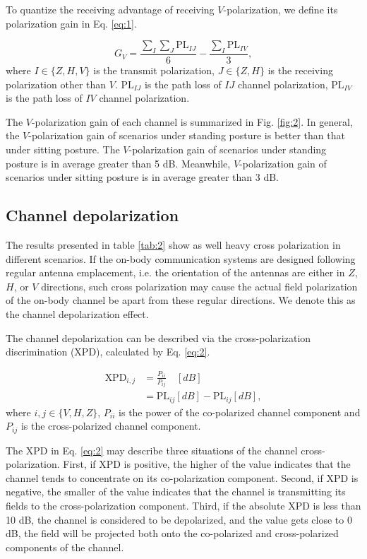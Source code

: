 \documentclass[conference]{IEEEtran}
\begin{document}
To quantize the receiving advantage of receiving $V$-polarization, we define its polarization gain in Eq. \ref{eq:1}.

\begin{equation}
	G_{V}=\frac{\sum\limits_I\sum\limits_J\text{PL}_{IJ}}{6} -\frac{\sum\limits_I{\text{PL}_{IV}}}{3},
\label{eq:1}
\end{equation}
where $I\in\{Z,H,V\}$ is the transmit polarization, $J\in\{Z,H\}$ is the receiving polarization other than $V$. $\text{PL}_{IJ}$ is the path loss of $IJ$ channel polarization, $\text{PL}_{IV}$ is the path loss of $IV$ channel polarization.

The $V$-polarization gain of each channel is summarized in Fig. \ref{fig:2}. In general, the $V$-polarization gain of scenarios under standing posture is better than that under sitting posture. The $V$-polarization gain of scenarios under standing posture is in average greater than 5 dB. Meanwhile, $V$-polarization gain of scenarios under sitting posture is in average greater than 3 dB.

\subsection{Channel depolarization}
The results presented in table \ref{tab:2} show as well heavy cross polarization in different scenarios. If the on-body communication systems are designed following regular antenna emplacement, i.e. the orientation of the antennas are either in $Z$, $H$, or $V$ directions, such cross polarization may cause the actual field polarization of the on-body channel be apart from these regular directions. We denote this as the channel depolarization effect.

The channel depolarization can be described via the cross-polarization discrimination (XPD), calculated by Eq. \ref{eq:2}.

 \begin{align}
	 \text{XPD}_{i,j}&=\frac{P_{ii}}{P_{ij}} \quad[dB]\nonumber\\
	 &=\text{PL}_{ij}[dB]-\text{PL}_{ij}[dB], \label{eq:2}
\end{align}
where $i,j \in \{V,H,Z\}$, $P_{ii}$ is the power of the co-polarized channel component and $P_{ij}$ is the cross-polarized channel component.

The XPD in Eq. \ref{eq:2} may describe three situations of the channel cross-polarization. First, if XPD is positive, the higher of the value indicates that the channel tends to concentrate on its co-polarization component. Second, if XPD is negative, the smaller of the value indicates that the channel is transmitting its fields to the cross-polarization component. Third, if the absolute XPD is less than 10 dB, the channel is considered to be depolarized, and the value gets close to 0 dB, the field will be projected both onto the co-polarized and cross-polarized components of the channel.
\end{document}

